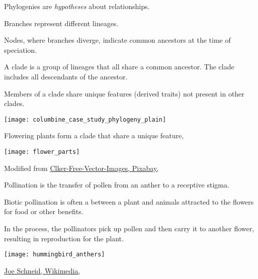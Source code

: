 \documentclass[t,handout]{beamer}  %
\begin{document}
%
\begin{frame}[t]{Phylogenies are \emph{hypotheses} about relationships.}
	
	\begin{multicols}{2}
		\hangpara Branches represent different lineages.\vspace*{-1ex}

		\hangpara Nodes, where branches diverge, indicate common ancestors at the time of speciation.\vspace*{-1ex}

		\hangpara A clade is a group of lineages that all share a common ancestor. The clade includes all descendants of the ancestor.\vspace*{-1ex}
			
		\hangpara Members of a clade share unique features (derived traits) not present in other clades.\vspace*{-1ex} %

	\columnbreak
		
		\hfill \texttt{[image: columbine\_case\_study\_phylogeny\_plain]}
		
	\end{multicols}
\end{frame}
%
\begin{frame}[t]{Flowering plants form a clade that share a unique feature, }
	
	{\centering 
	\texttt{[image: flower\_parts]}
	}
	
	\vfilll
	
	\hfill \tiny Modified from \href{https://pixabay.com/en/diagram-flower-mature-anatomy-41571/}{Clker-Free-Vector-Images, Pixabay, \cc{}}
	
\end{frame}
%
\begin{frame}[t]{Pollination is the transfer of pollen from an anther to a receptive stigma.}

	\begin{multicols}{2}
	\hangpara Biotic pollination is often a  between a plant and animals attracted to the flowers for food or other benefits. 
	
	\hangpara In the process, the pollinators pick up pollen and then carry it to another flower, resulting in reproduction for the plant. 

	\columnbreak
	
	\texttt{[image: hummingbird\_anthers]}
	\end{multicols}
	
	\vfilll
	
	\hfill \tiny \href{https://commons.wikimedia.org/wiki/File:RubyThroatedHummingbird.jpg}{Joe Schneid, Wikimedia, } %
	
\end{frame}
\end{document}
